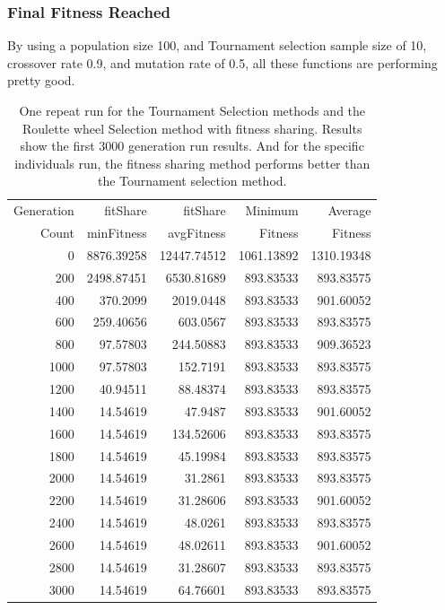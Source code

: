 \documentclass[10pt,b5paper]{article}
\begin{document}
\subsubsection{Final Fitness Reached}
\label{sec-3-1-2}
By using a population size 100, and Tournament selection sample size of 10, crossover rate 0.9, and mutation rate of 0.5, all these functions are performing pretty good. 
\begin{table}[htb]
\caption{One repeat run for the Tournament Selection methods and the Roulette wheel Selection method with fitness sharing. Results show the first 3000 generation run results. And for the specific individuals run, the fitness sharing method performs better than the Tournament selection method.}
\centering
\begin{tabular}{rrrrr}
\hline
Generation & fitShare & fitShare & Minimum & Average\\
Count & minFitness & avgFitness & Fitness & Fitness\\
\hline
0 & 8876.39258 & 12447.74512 & 1061.13892 & 1310.19348\\
200 & 2498.87451 & 6530.81689 & 893.83533 & 893.83575\\
400 & 370.2099 & 2019.0448 & 893.83533 & 901.60052\\
600 & 259.40656 & 603.0567 & 893.83533 & 893.83575\\
800 & 97.57803 & 244.50883 & 893.83533 & 909.36523\\
1000 & 97.57803 & 152.7191 & 893.83533 & 893.83575\\
1200 & 40.94511 & 88.48374 & 893.83533 & 893.83575\\
1400 & 14.54619 & 47.9487 & 893.83533 & 901.60052\\
1600 & 14.54619 & 134.52606 & 893.83533 & 893.83575\\
1800 & 14.54619 & 45.19984 & 893.83533 & 893.83575\\
2000 & 14.54619 & 31.2861 & 893.83533 & 893.83575\\
2200 & 14.54619 & 31.28606 & 893.83533 & 901.60052\\
2400 & 14.54619 & 48.0261 & 893.83533 & 893.83575\\
2600 & 14.54619 & 48.02611 & 893.83533 & 901.60052\\
2800 & 14.54619 & 31.28607 & 893.83533 & 893.83575\\
3000 & 14.54619 & 64.76601 & 893.83533 & 893.83575\\
\hline
\end{tabular}
\end{table}
\end{document}
